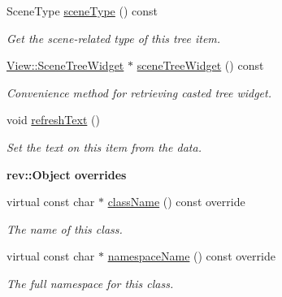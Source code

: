 \begin{Indent}
\begin{DoxyCompactItemize}
\mbox{\label{classrev_1_1_view_1_1_scene_related_item_afecf99f2bcf041c1f289436ab4c72246}} 
Scene\+Type \mbox{\hyperlink{classrev_1_1_view_1_1_scene_related_item_afecf99f2bcf041c1f289436ab4c72246}{scene\+Type}} () const
\begin{DoxyCompactList}\small\item\em Get the scene-\/related type of this tree item. \end{DoxyCompactList}\item 
\mbox{\label{classrev_1_1_view_1_1_scene_related_item_ab65c65882f439fe640533c46fe895c31}} 
\mbox{\hyperlink{classrev_1_1_view_1_1_scene_tree_widget}{View\+::\+Scene\+Tree\+Widget}} $\ast$ \mbox{\hyperlink{classrev_1_1_view_1_1_scene_related_item_ab65c65882f439fe640533c46fe895c31}{scene\+Tree\+Widget}} () const
\begin{DoxyCompactList}\small\item\em Convenience method for retrieving casted tree widget. \end{DoxyCompactList}\item 
\mbox{\label{classrev_1_1_view_1_1_scene_related_item_a5d2bc33ee72a509774eb189ef052e05f}} 
void \mbox{\hyperlink{classrev_1_1_view_1_1_scene_related_item_a5d2bc33ee72a509774eb189ef052e05f}{refresh\+Text}} ()
\begin{DoxyCompactList}\small\item\em Set the text on this item from the data. \end{DoxyCompactList}\end{DoxyCompactItemize}
\end{Indent}
\begin{Indent}\textbf{ rev\+::Object overrides}\par
\begin{DoxyCompactItemize}
\item 
virtual const char $\ast$ \mbox{\hyperlink{classrev_1_1_view_1_1_scene_related_item_ae2eff65bbbea3332ccdc41fb85a1f270}{class\+Name}} () const override
\begin{DoxyCompactList}\small\item\em The name of this class. \end{DoxyCompactList}\item 
virtual const char $\ast$ \mbox{\hyperlink{classrev_1_1_view_1_1_scene_related_item_a627f509d311402581f9fafadd2e7e014}{namespace\+Name}} () const override
\begin{DoxyCompactList}\small\item\em The full namespace for this class. \end{DoxyCompactList}\end{DoxyCompactItemize}
\end{Indent}
